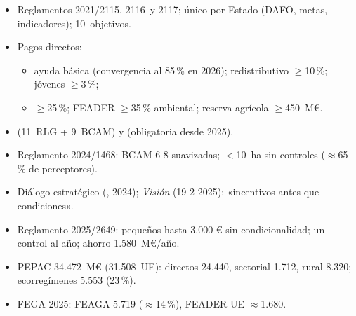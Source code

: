 \documentclass{article}
\begin{document}
\begin{columnas}
\begin{itemize}
\item Reglamentos 2021/2115, 2116~y 2117;  único por Estado (DAFO, metas, indicadores); 10~objetivos.
\item Pagos directos:
  \begin{itemize}
  \item ayuda básica (convergencia al 85\,\% en 2026); redistributivo $\geq$10\,\%; jóvenes $\geq$3\,\%;
  \item {} $\geq$25\,\%; FEADER $\geq$35\,\% ambiental; reserva agrícola $\geq$450~M€.
  \end{itemize}
\end{itemize}
\begin{itemize}
\item {} (11~RLG + 9~BCAM) y  (obligatoria desde 2025).
\end{itemize}
\begin{itemize}
\item Reglamento 2024/1468: BCAM 6-8 suavizadas; $<$10~ha sin controles ($\approx$65\,\% de perceptores).
\item Diálogo estratégico (, 2024); \emph{Visión} (19-2-2025): «incentivos antes que condiciones».
\item Reglamento 2025/2649: pequeños hasta 3.000 € sin condicionalidad; un control al año; ahorro 1.580~M€/año.
\end{itemize}
\begin{itemize}
\item PEPAC 34.472~M€ (31.508~UE): directos 24.440, sectorial 1.712, rural 8.320; ecorregímenes 5.553 (23\,\%).
\item FEGA 2025: FEAGA 5.719 ($\approx$14\,\%), FEADER UE $\approx$1.680.
\end{itemize}


\end{columnas}
\end{document}
